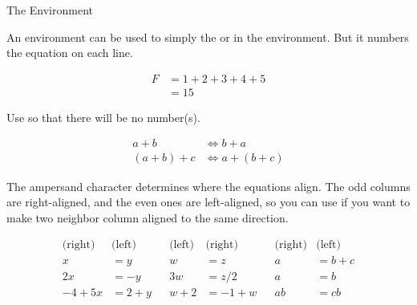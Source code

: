 \begin{frame}[fragile]{The  Environment}

An  environment can be used to simply the  or  in the   environment. But it numbers the equation on each line.

\begin{latexexamplesplit}
\begin{align}
  F &= 1+2+3+4+5 \\
    &= 15
\end{align}
\end{latexexamplesplit}

Use  so that there will be no number(s).

\begin{latexexamplesplit}
\begin{align*}
  a+b & \Leftrightarrow b+a \\
  (a+b)+c & \Leftrightarrow a+(b+c)
\end{align*}
\end{latexexamplesplit}

\end{frame}

\begin{frame}[fragile]

The ampersand character \LC{&} determines where the equations align. The odd columns are right-aligned, and the even ones are left-aligned, so you can use \LC{&&} if you want to make two neighbor column aligned to the same direction.

\setlength{\belowdisplayskip}{-10pt}
\begin{latexexample}
\begin{align*}
  \text{(right)} & \text{(left)} && \text{(left)} & \text{(right)} 
  &&  \text{(right)} & \text{(left)} \\
  x     &=y     &&  w   &=z        &&  a&=b+c \\
  2x    &=-y    &&  3w  &=z/2      &&  a&=b \\
  -4+5x &=2+y   &&  w+2 &=-1+w     &&  ab&=cb
\end{align*}
\end{latexexample}

\end{frame}



